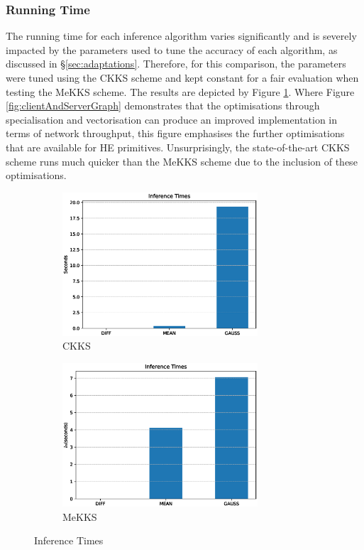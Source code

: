 \subsubsection{Running Time}
\indent \indent
The running time for each inference algorithm varies significantly and is severely impacted by the parameters used to tune the accuracy of each algorithm, as discussed in §\ref{sec:adaptations}. Therefore, for this comparison, the parameters were tuned using the CKKS scheme and kept constant for a fair evaluation when testing the MeKKS scheme. The results are depicted by Figure \ref{fig:inferenceTime}. Where Figure \ref{fig:clientAndServerGraph} demonstrates that the optimisations through specialisation and vectorisation can produce an improved implementation in terms of network throughput, this figure emphasises the further optimisations that are available for HE primitives. Unsurprisingly, the state-of-the-art CKKS scheme runs much quicker than the MeKKS scheme due to the inclusion of these optimisations.

\begin{figure}[h!]
    \centering
    \begin{subfigure}[b]{0.495\textwidth}
        \centering
        \includegraphics[width=0.8\textwidth]{figures/inferenceTimesCKKS}
        \caption{CKKS}
    \end{subfigure}
    \hfill
    \begin{subfigure}[b]{0.495\textwidth}
        \centering
        \includegraphics[width=0.8\textwidth]{figures/inferenceTimesMeKKS}
        \caption{MeKKS}
    \end{subfigure}
    \caption{Inference Times}
    \label{fig:inferenceTime}
\end{figure}

